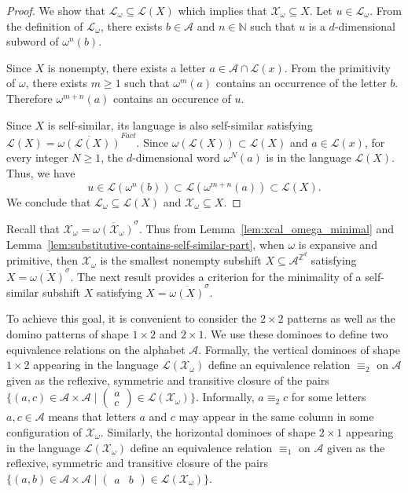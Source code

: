 \documentclass[12pt]{amsart}
\newcommand{\N}{\mathbb{N}}
\newcommand{\Z}{\mathbb{Z}}
\newcommand{\Acal}{\mathcal{A}} %
\newcommand{\Lcal}{\mathcal{L}}
\newcommand{\Xcal}{\mathcal{X}} %
\newcommand{\factorialclosure}[1]{{\overline{#1}^{Fact}}}
\newcommand{\shiftclosure}[1]{{\overline{#1}^{\sigma}}}
\begin{document}
\begin{proof}
    We show that $\Lcal_\omega\subseteq\Lcal(X)$
    which implies that $\Xcal_\omega\subseteq X$.
    Let $u\in\Lcal_\omega$.
    From the definition of $\Lcal_\omega$,
    there exists $b\in\Acal$ and $n\in\N$ such that
    $u$ is a $d$-dimensional subword of $\omega^n(b)$.

    Since $X$ is nonempty,
    there exists a letter $a\in\Acal\cap\Lcal(x)$.
    From the primitivity of $\omega$, 
    there exists $m\geq1$ such that
    $\omega^m(a)$ contains an occurrence of the letter $b$.
    Therefore $\omega^{m+n}(a)$ contains an occurence of $u$.

    Since $X$ is self-similar, its
    language is also self-similar satisfying
    $\Lcal(X)=\factorialclosure{\omega(\Lcal(X))}$.
    Since $\omega(\Lcal(X))\subset\Lcal(X)$
    and $a\in\Lcal(x)$,
    for every integer $N\geq1$,
    the $d$-dimensional word $\omega^N(a)$ is in the
    language $\Lcal(X)$.
    Thus, we have
    \[
        u 
        \in
        \Lcal(\omega^n(b))
        \subset
        \Lcal(\omega^{m+n}(a))
        \subset
        \Lcal(X).
    \]
    We conclude that $\Lcal_\omega\subseteq\Lcal(X)$ and
    $\Xcal_\omega\subseteq X$.
\end{proof}

Recall that $\Xcal_\omega=\shiftclosure{\omega(\Xcal_\omega)}$.
Thus from Lemma~\ref{lem:xcal_omega_minimal} and
Lemma~\ref{lem:substitutive-contains-self-similar-part},
when $\omega$ is expansive and primitive, then 
$\Xcal_\omega$ is the smallest nonempty subshift
$X\subseteq\Acal^{\Z^d}$ satisfying $X=\shiftclosure{\omega(X)}$.
The next result provides a criterion
for the minimality of a self-similar subshift $X$ satisfying
$X=\shiftclosure{\omega(X)}$.

To achieve this goal, it is convenient to
consider the $2\times 2$ patterns as well as the domino patterns
of shape $1\times 2$ and $2\times 1$.
We use these dominoes to define two equivalence relations on the alphabet $\Acal$.
Formally, the vertical dominoes of shape $1\times 2$ 
appearing in the language $\Lcal(\Xcal_\omega)$
define an equivalence relation
$\equiv_2$ on $\Acal$ given as the reflexive, symmetric and transitive closure
of the pairs 
$\{(a,c)\in\Acal\times\Acal\mid 
 \left(\begin{smallmatrix} a\\ c \end{smallmatrix}\right)
 \in\Lcal(\Xcal_\omega)\}$.
Informally, $a\equiv_2 c$ for some letters $a,c\in\Acal$ means that letters $a$ and $c$
may appear in the same column in some configuration of $\Xcal_\omega$.
Similarly, the horizontal dominoes of shape $2\times 1$ 
appearing in the language $\Lcal(\Xcal_\omega)$
define an equivalence relation
$\equiv_1$ on $\Acal$ given as the reflexive, symmetric and transitive closure
of the pairs 
$\{(a,b)\in\Acal\times\Acal\mid 
 \left(\begin{smallmatrix} a& b \end{smallmatrix}\right)
 \in\Lcal(\Xcal_\omega)\}$.
\end{document}
